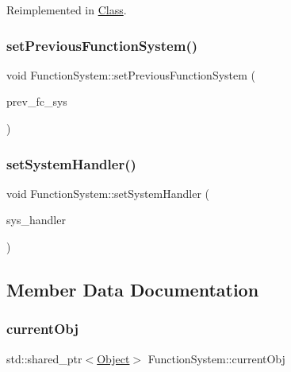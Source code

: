 Reimplemented in \hyperlink{classClass_a757c7a4cb7e9e0b5486a087b953e919e}{Class}.

\mbox{\label{classFunctionSystem_a2304a8ecdf5ddad124779b75be69f4a1}} 
\subsubsection{\texorpdfstring{set\+Previous\+Function\+System()}{setPreviousFunctionSystem()}}
{\footnotesize\ttfamily void Function\+System\+::set\+Previous\+Function\+System (\begin{DoxyParamCaption}\item[{\hyperlink{classFunctionSystem}{Function\+System} $\ast$}]{prev\+\_\+fc\+\_\+sys }\end{DoxyParamCaption})}

\mbox{\label{classFunctionSystem_a7924e14b5794c595167aa9d547182883}} 
\subsubsection{\texorpdfstring{set\+System\+Handler()}{setSystemHandler()}}
{\footnotesize\ttfamily void Function\+System\+::set\+System\+Handler (\begin{DoxyParamCaption}\item[{\hyperlink{classSystemHandler}{System\+Handler} $\ast$}]{sys\+\_\+handler }\end{DoxyParamCaption})}



\subsection{Member Data Documentation}
\mbox{\label{classFunctionSystem_a59f2a49d91338ced0a79d3898412fcaf}} 
\subsubsection{\texorpdfstring{current\+Obj}{currentObj}}
{\footnotesize\ttfamily std\+::shared\+\_\+ptr$<$\hyperlink{classObject}{Object}$>$ Function\+System\+::current\+Obj}

